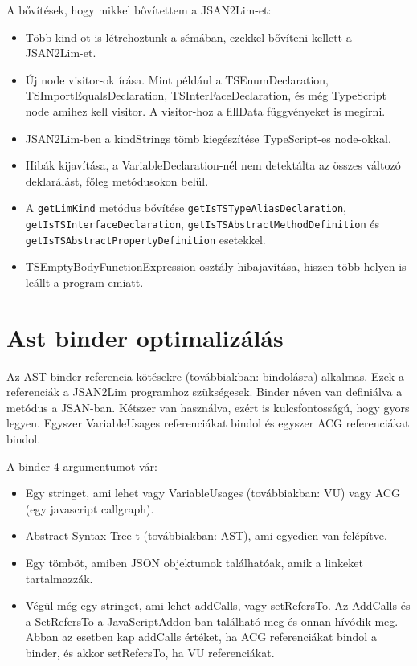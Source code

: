 A bővítések, hogy mikkel bővítettem a JSAN2Lim-et:
\begin{itemize}
      \item Több kind-ot is létrehoztunk a sémában, ezekkel bővíteni kellett a JSAN2Lim-et.
      \item Új node visitor-ok írása. Mint például a TSEnumDeclaration, TSImportEqualsDeclaration, TSInterFaceDeclaration, és még TypeScript node amihez kell visitor.
      A visitor-hoz a fillData függvényeket is megírni.
      \item JSAN2Lim-ben a kindStrings tömb kiegészítése TypeScript-es node-okkal.
      \item Hibák kijavítása, a VariableDeclaration-nél nem detektálta az összes változó deklarálást, főleg metódusokon belül.
      \item A \texttt{getLimKind} metódus bővítése \texttt{getIsTSTypeAliasDeclaration}, \texttt{getIsTSInterfaceDeclaration},
      \texttt{getIsTSAbstractMethodDefinition} és \texttt{getIsTSAbstractPropertyDefinition} esetekkel.
      \item TSEmptyBodyFunctionExpression osztály hibajavítása, hiszen több helyen is leállt a program emiatt.
\end{itemize}

\section{Ast binder optimalizálás}

\noindent

Az AST binder referencia kötésekre (továbbiakban: bindolásra) alkalmas. Ezek a referenciák a JSAN2Lim programhoz szükségesek.
Binder néven van definiálva a metódus a JSAN-ban.
Kétszer van használva, ezért is kulcsfontosságú, hogy gyors legyen.
Egyszer VariableUsages referenciákat bindol és egyszer ACG referenciákat bindol.

\noindent

A binder 4 argumentumot vár:
\begin{itemize}
      \item Egy stringet, ami lehet vagy VariableUsages (továbbiakban: VU) vagy ACG (egy javascript callgraph).
      \item Abstract Syntax Tree-t (továbbiakban: AST), ami egyedien van felépítve.
      \item Egy tömböt, amiben JSON objektumok találhatóak, amik a linkeket tartalmazzák.
      \item Végül még egy stringet, ami lehet addCalls, vagy setRefersTo. Az AddCalls és a SetRefersTo a JavaScriptAddon-ban található meg és onnan hívódik meg.
      Abban az esetben kap addCalls értéket, ha ACG referenciákat bindol a binder, és akkor setRefersTo, ha VU referenciákat.
\end{itemize}

